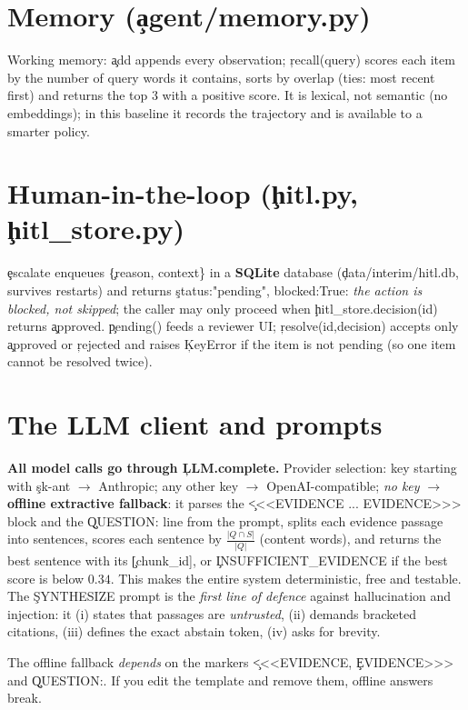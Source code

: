 \section{Memory (\c{agent/memory.py})}
Working memory: \c{add} appends every observation; \c{recall(query)} scores each item by the number of query words it contains, sorts by overlap (ties: most recent first) and returns the top 3 with a positive score. It is lexical, not semantic (no embeddings); in this baseline it records the trajectory and is available to a smarter policy.

\section{Human-in-the-loop (\c{hitl.py}, \c{hitl\_store.py})}
\c{escalate} enqueues \c{\{reason, context\}} in a \textbf{SQLite} database (\c{data/interim/hitl.db}, survives restarts) and returns \c{status:"pending", blocked:True}: \emph{the action is blocked, not skipped}; the caller may only proceed when \c{hitl\_store.decision(id)} returns \c{approved}. \c{pending()} feeds a reviewer UI; \c{resolve(id,decision)} accepts only \c{approved} or \c{rejected} and raises \c{KeyError} if the item is not pending (so one item cannot be resolved twice).

\section{The LLM client and prompts}
\textbf{All model calls go through \c{LLM.complete}.} Provider selection: key starting with \c{sk-ant} $\to$ Anthropic; any other key $\to$ OpenAI-compatible; \emph{no key} $\to$ \textbf{offline extractive fallback}: it parses the \c{<<<EVIDENCE ... EVIDENCE>>>} block and the \c{QUESTION:} line from the prompt, splits each evidence passage into sentences, scores each sentence by $\frac{|Q\cap S|}{|Q|}$ (content words), and returns the best sentence with its \c{[chunk\_id]}, or \c{INSUFFICIENT\_EVIDENCE} if the best score is below $0.34$. This makes the entire system deterministic, free and testable.
The \c{SYNTHESIZE} prompt is the \emph{first line of defence} against hallucination and injection: it (i) states that passages are \emph{untrusted}, (ii) demands bracketed citations, (iii) defines the exact abstain token, (iv) asks for brevity. \begin{gotcha}The offline fallback \emph{depends} on the markers \c{<<<EVIDENCE}, \c{EVIDENCE>>>} and \c{QUESTION:}. If you edit the template and remove them, offline answers break.\end{gotcha}

